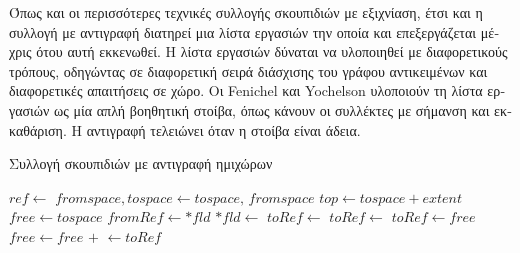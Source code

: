 \begin{greek}
Όπως και οι περισσότερες τεχνικές συλλογής σκουπιδιών με εξιχνίαση, 
έτσι και η συλλογή με αντιγραφή διατηρεί μια λίστα εργασιών την 
οποία και επεξεργάζεται μέχρις ότου αυτή εκκενωθεί. Η λίστα εργασιών 
δύναται να υλοποιηθεί με διαφορετικούς τρόπους, οδηγώντας σε
διαφορετική σειρά διάσχισης του γράφου αντικειμένων και διαφορετικές
απαιτήσεις σε χώρο. Οι Fenichel και Yochelson \cite{DBLP:journals/cacm/FenichelY69}
υλοποιούν τη λίστα εργασιών ως μία απλή βοηθητική στοίβα, όπως 
κάνουν οι συλλέκτες με σήμανση και εκκαθάριση. Η αντιγραφή τελειώνει 
όταν η στοίβα είναι άδεια.

\begin{algorithm}
  \caption{Συλλογή σκουπιδιών με αντιγραφή ημιχώρων}
  \label{alg:cop_2}
  \begin{algorithmic}[1]
      \State {}
      \State {} 
       
        \State {}
      \EndFor
       
        \State $ref \gets$ 
        \State {}
      \EndWhile    
    \EndProcedure
    \Statex
      \State $fromspace, tospace \gets tospace, \, fromspace$
       \State $top \gets tospace + extent$
      \State $free \gets tospace$
    \EndProcedure  
    \Statex
        \State {}      
      \EndFor
    \EndProcedure
    \Statex
     
      \State $fromRef \gets *fld$
        \State $*fld \gets$  
      \EndIf
    \EndProcedure
    \Statex
      \State $toRef \gets$ 
       
        \State $toRef \gets$ 
      \EndIf
      \State {}
    \EndFunction
    \Statex                                                  
     
      \State $toRef \gets free$
      \State $free \gets free$ $+$ 
      \State {}
      \State {} $\gets toRef$ 
      \State {}
      \State {}
    \EndFunction
  \end{algorithmic}
\end{algorithm}


\end{greek}
